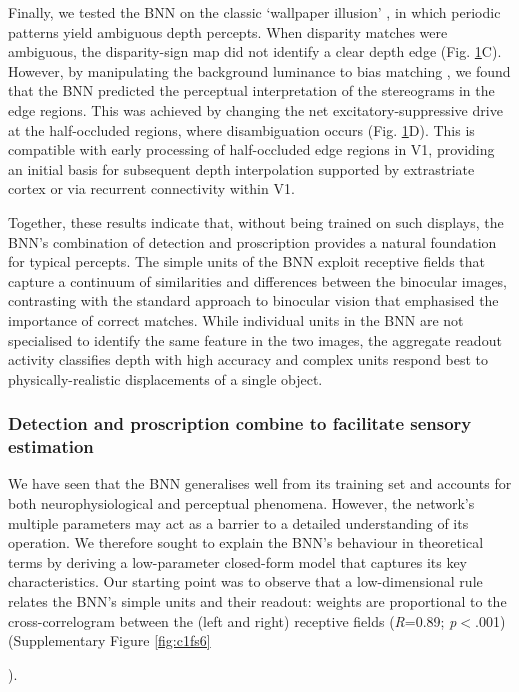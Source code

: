 {\begin{figure}[!h]
  \label{fig:c1f6}
\end{figure}

Finally, we tested the BNN on the classic `wallpaper illusion' \cite{Brewster:1844jy}, in which periodic patterns yield ambiguous depth percepts. When disparity matches were ambiguous, the disparity-sign map did not identify a clear depth edge (Fig. \ref{fig:c1f6}C). However, by manipulating the background luminance to bias matching \cite{Anderson:1994fk}, we found that the BNN predicted the perceptual interpretation of the stereograms in the edge regions. This was achieved by changing the net excitatory-suppressive drive at the half-occluded regions, where disambiguation occurs (Fig. \ref{fig:c1f6}D). This is compatible with early processing of half-occluded edge regions in V1, providing an initial basis for subsequent depth interpolation supported by extrastriate cortex \cite{Mckee:2007da} or via recurrent connectivity within V1.

Together, these results indicate that, without being trained on such displays, the BNN's combination of detection and proscription provides a natural foundation for typical percepts. The simple units of the BNN exploit receptive fields that capture a continuum of similarities and differences between the binocular images, contrasting with the standard approach to binocular vision that emphasised the importance of correct matches. While individual units in the BNN are not specialised to identify the same feature in the two images, the aggregate readout activity classifies depth with high accuracy and complex units respond best to physically-realistic displacements of a single object.

\subsubsection*{Detection and proscription combine to facilitate sensory estimation}

We have seen that the BNN generalises well from its training set and accounts for both neurophysiological and perceptual phenomena. However, the network's multiple parameters may act as a barrier to a detailed understanding of its operation. We therefore sought to explain the BNN's behaviour in theoretical terms by deriving a low-parameter closed-form model that captures its key characteristics. Our starting point was to observe that a low-dimensional rule relates the BNN's simple units and their readout: weights are proportional to the cross-correlogram between the (left and right) receptive fields ({\it R}=0.89; {\it p}$<$.001) (Supplementary Figure \ref{fig:c1fs6}}). 


